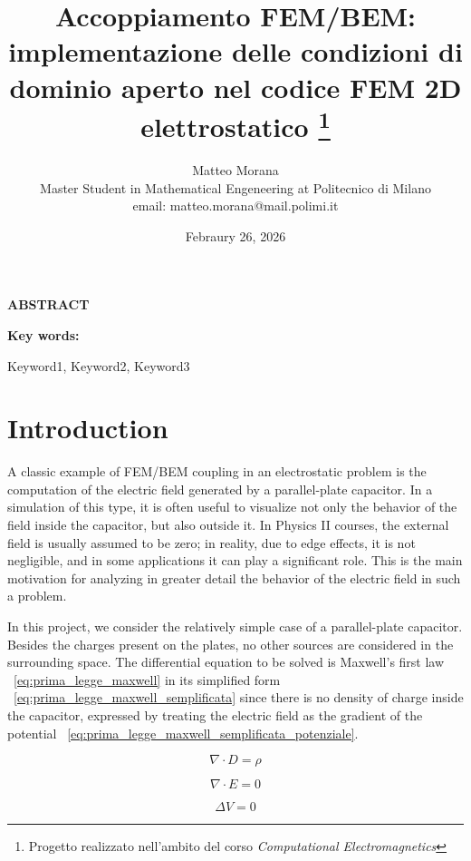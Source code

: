 \documentclass[11pt,onecolumn]{article}
\title{Accoppiamento FEM/BEM: implementazione delle condizioni di dominio aperto nel codice FEM 2D
elettrostatico \thanks{Progetto realizzato nell'ambito del corso \textit{Computational Electromagnetics}}}
\author{Matteo Morana \\
Master Student in Mathematical Engeneering at Politecnico di Milano \\ email: matteo.morana@mail.polimi.it}
\date{Febraury 26, 2026}
\newenvironment{cwpabstract}
{%
  \begin{list}{}{%
    \setlength{\leftmargin}{0.32\textwidth} %
    \setlength{\rightmargin}{0pt}
    \setlength{\listparindent}{0pt}
    \setlength{\itemindent}{0pt}
    \setlength{\parsep}{0pt}
  }
  \item[]
  \noindent\textbf{ABSTRACT}\par
  \vspace{0.5em}
  \normalsize
}
{%
  \end{list}
}
\newenvironment{cwpkeywords}
{%
  \begin{list}{}{%
    \setlength{\leftmargin}{0.32\textwidth}
    \setlength{\rightmargin}{0pt}
  }
  \item[]\textbf{Key words: }
}
{%
  \end{list}
}
\begin{document}
\maketitle


\begin{cwpabstract}
\lipsum[2]
\end{cwpabstract}


\begin{cwpkeywords}
Keyword1, Keyword2, Keyword3 
\end{cwpkeywords}


\section{Introduction}

A classic example of FEM/BEM coupling in an electrostatic problem is the computation of the electric field generated by a parallel-plate capacitor. In a simulation of this type, it is often useful to visualize not only the behavior of the field inside the capacitor, but also outside it. In Physics II courses, the external field is usually assumed to be zero; in reality, due to edge effects, it is not negligible, and in some applications it can play a significant role. This is the main motivation for analyzing in greater detail the behavior of the electric field in such a problem.

In this project, we consider the relatively simple case of a parallel-plate capacitor. Besides the charges present on the plates, no other sources are considered in the surrounding space. The differential equation to be solved is Maxwell's first law ~\eqref{eq:prima_legge_maxwell} {\color{cyan} in its simplified form ~\eqref{eq:prima_legge_maxwell_semplificata} since there is no density of charge inside the capacitor}, expressed by treating the electric field as the gradient of the potential ~\eqref{eq:prima_legge_maxwell_semplificata_potenziale}.

\begin{equation}
	\nabla \cdot D = \rho
\label{eq:prima_legge_maxwell}
\end{equation}

\begin{equation}
	\nabla \cdot E = 0
\label{eq:prima_legge_maxwell_semplificata}
\end{equation}

\begin{equation}
	\Delta V = 0
\label{eq:prima_legge_maxwell_semplificata_potenziale}
\end{equation}
\end{document}

